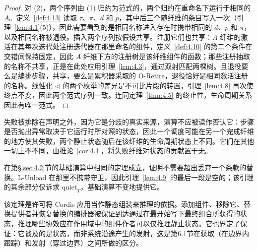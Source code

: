 \begin{proof}
对 (2)，两个序列由 (1) 归约为范式的，两个归约在重命名下运行于相同的 $A$。定义~\ref{def:4.13} 读取 $\tau$、$\pi$、$d$ 和 $p$，其中后三个随纤维的条目写入一次（引理~\ref{lem:4.1}(5)），因此需要看到的是相同名称进入存在时携带相同的 $d$、$p$ 和 $\pi$，以及相同名称被退役。插入两个序列按假设共享。注册它们也共享：$A$ 纤维的激活在其每次迭代处注册迭代器在那里命名的组件，定义~\ref{def:4.10} 的第二个条件在交错间保持固定，因此 $A$ 纤维下方的注册树是该纤维组件的函数；那些注册抽取的名称不共享，正是在此处应用引理~\ref{lem:4.3}，通过双射匹配两棵树。且退役要么是编排步骤，共享，要么是累积器采取的 O-Retire，退役恰好是相同激活注册的名称。线性化 $\triangleleft$ 的两个枚举的差异是不可比片段的转置，引理~\ref{lem:4.8} 再次使终点不变，因此两个范式序列一致。连同定理~\ref{thm:4.5} 的终止性，生命周期关系因此有唯一范式。
\end{proof}

失败被排除在声明之外，因为它是分歧的真实来源，演算不应被读作否认它：步骤是否抛出异常取决于它运行时所对照的状态，因此一个调度可能在另一个完成纤维的地方使其失败，两个静止状态随后在该纤维的生命周期状态上不同。它们在其他一切上不不同，由推论~\ref{cor:4.1}，将失败纤维对状态的贡献置于无。

在第\S\ref{sec:4.2}节的基础演算中相同的定理成立，证明不需要超出丢弃一个条款的替换。L-Unload 在那里不携带守卫，因此引理~\ref{lem:4.9} 的最后一段是空的；该引理的其余部分仅诉求 $\mathrm{quiet}_T$，基础演算不变地提供它。

该定理是许可将 Cordis 应用当作静态组装来推理的依据。添加组件、移除它、替换提供者并恢复替换的编排器被保证到达通过在最开始写下最终组合所获得的状态，推理哪些协效应在作用域中的组件作者可以仅推理静止状态。它也界定了保证：它谈及的是状态，而非系统沿途产生的发射，这是第6.1节在获取（在边界内跟踪）和发射（穿过边界）之间所做的区分。
